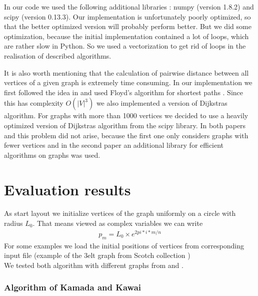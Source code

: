 \documentclass[12pt,a4paper]{article}
\begin{document}
In our code we used the following additional libraries : numpy (version 1.8.2) and scipy (version 0.13.3). Our implementation is unfortunately poorly optimized, so that the better optimized version will probably perform better. But we did some optimization, because the initial implementation contained a lot of loops, which are rather slow in Python. So we used a vectorization to get rid of loops in the realisation of described algorithms.

It is also worth mentioning that the calculation of pairwise distance between all vertices of a given graph is extremely time consuming. In our implementation we first followed the idea in \cite{TomihisaKamada1989} and used Floyd's algorithm for shortest paths \cite{Floyd1962}. Since this has complexity $ O(|V|^3)$ we also implemented a version of Dijkstras algorithm. For graphs with more than 1000 vertices we decided to use a heavily optimized version of Dijkstras algorithm from the scipy library. In both papers \cite{TomihisaKamada1989} and \cite{DavidHarel2002} this problem did not arise, because the first one only considers graphs with fewer vertices and in the second paper an additional library for efficient algorithms on graphs was used.

\section{Evaluation results}

As start layout we initialize vertices of the graph uniformly on a circle with radius $L_0$. That means viewed as complex variables we can write 
\begin{align*}
p_m =L_0 \times e^{2 pi*i*m /n}
\end{align*}
For some examples we load the initial positions of vertices from corresponding input file (example of the 3elt graph from Scotch collection \cite{JordiPetit})\\

We tested both algorithm with different graphs from \cite{TomihisaKamada1989} and \cite{DavidHarel2002}. 

\FloatBarrier 

\subsubsection*{Algorithm of Kamada and Kawai}
\end{document}

